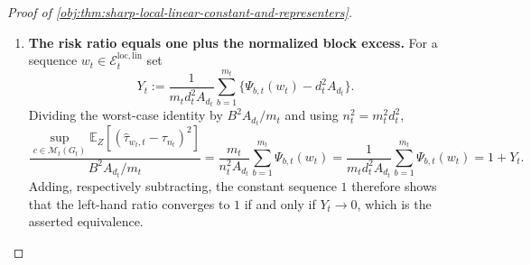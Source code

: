 \begin{proof}[Proof of \cref{obj:thm:sharp-local-linear-constant-and-representers}]
\begin{enumerate}
Fix a block \(V_b\) and an admissible choice \((\varepsilon_i,S_i)_{i\in V_b}\) in \(\Psi_{b,t}\).  All units of \(V_b\) carry the same weight \(g_{d}(Z_b)\), so
\[
\sum_{i\in V_b}\varepsilon_i\bigl\{w^0_{i,t}(Z_b)Z_{S_i}-\mathbf 1(S_i\ne\varnothing)\bigr\}
=
g_{d}(Z_b)F(Z_b)-\Lambda,
\]
\[
F(Z_b):=\sum_{i\in V_b}\varepsilon_iZ_{S_i},
\qquad
\Lambda:=\sum_{i\in V_b}\varepsilon_i\mathbf 1(S_i\ne\varnothing).
\]
The block-score identities give \(\mathbb E_Z[g_{d}(Z_b)F(Z_b)]=\Lambda\), whence
\[
\mathbb E_Z\!\left[\bigl(g_{d}(Z_b)F(Z_b)-\Lambda\bigr)^2\right]
=
\mathbb E_Z\!\left[\bigl(g_{d}(Z_b)F(Z_b)\bigr)^2\right]-\Lambda^2
\le
\mathbb E_Z\!\left[\bigl(g_{d}(Z_b)F(Z_b)\bigr)^2\right].
\]
Since \(0\le Z_{S_i}\le1\), \(|\varepsilon_i|=1\) and \(|V_b|=d\), we have \(|F(Z_b)|\le d\) pointwise, so
\[
\mathbb E_Z\!\left[\bigl(g_{d}(Z_b)F(Z_b)\bigr)^2\right]
\le
d^2\,\mathbb E_Z[g_{d}(Z_b)^2]
=
d^2A .
\]
Maximizing over admissible choices gives the upper bound, and the empty-monomial construction gives the reverse inequality for the same canonical weights, so
\[
\Psi_{b,t}(w^0)\le d^2A,
\qquad\text{and}\qquad
\Psi_{b,t}(w^0)=d^2A .
\]
By the worst-case identity and the per-block lower bound, every \(w\in\mathcal E_t^{\mathrm{loc,lin}}\) satisfies
\[
\sup_{c\in\mathcal M_t(G_t)}\mathbb E_Z\!\left[(\widehat\tau_{w,t}-\tau_{n})^2\right]
=
\frac{B^2}{n^2}\sum_{b=1}^{m}\Psi_{b,t}(w)
\ge
\frac{B^2}{n^2}m d^2A
=
\frac{B^2A}{m},
\]
the last equality because \(n=md\); and the same computation with \(\Psi_{b,t}(w^0)=d^2A\) turns the inequality into an equality for \(w^0\).  Taking the infimum over \(\mathcal E_t^{\mathrm{loc,lin}}\),
\[
R_t^{\mathrm{loc,lin}}=\frac{B^2A_{d_t}}{m_t}
=\frac{B^2d_tA_{d_t}}{n_t},
\]
where the second equality is again \(n_t=m_td_t\). %

\item \textbf{The risk ratio equals one plus the normalized block excess.}  For a sequence \(w_t\in\mathcal E_t^{\mathrm{loc,lin}}\) set
\[
Y_t:=
\frac{1}{m_td_t^2A_{d_t}}
\sum_{b=1}^{m_t}\bigl\{\Psi_{b,t}(w_t)-d_t^2A_{d_t}\bigr\}.
\]
Dividing the worst-case identity by \(B^2A_{d_t}/m_t\) and using \(n_t^2=m_t^2d_t^2\),
\[
\frac{
\sup_{c\in\mathcal M_t(G_t)}\mathbb E_Z[(\widehat\tau_{w_t,t}-\tau_{n_t})^2]
}{
B^2A_{d_t}/m_t
}
=
\frac{m_t}{n_t^2A_{d_t}}\sum_{b=1}^{m_t}\Psi_{b,t}(w_t)
=
\frac{1}{m_td_t^2A_{d_t}}\sum_{b=1}^{m_t}\Psi_{b,t}(w_t)
=
1+Y_t .
\]
Adding, respectively subtracting, the constant sequence \(1\) therefore shows that the left-hand ratio converges to \(1\) if and only if \(Y_t\to0\), which is the asserted equivalence. %


\end{enumerate}
\end{proof}
